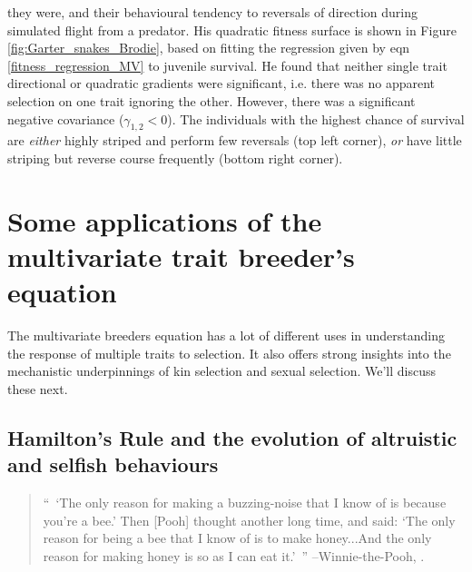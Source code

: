 they were, and their behavioural tendency to reversals of direction
during simulated flight from a predator. His quadratic fitness surface is shown in Figure
\ref{fig:Garter_snakes_Brodie}, based on fitting the
regression given by eqn \eqref{fitness_regression_MV} to juvenile
survival. He found that neither single trait directional or quadratic
gradients were significant, i.e. there was no apparent selection on one 
trait ignoring the other. However, there was a significant negative
covariance ($\gamma_{1,2}<0$). The individuals with the highest chance of survival are
{\it either} highly striped and perform few reversals (top left
corner), {\it or} have little striping but reverse course frequently
(bottom right corner). 


\section{Some applications of the multivariate trait breeder's equation}

The multivariate breeders equation has a lot of different uses in
understanding the response of multiple traits to selection. It also
offers strong insights into the mechanistic underpinnings of kin selection and sexual selection. We'll discuss these next.

\subsection{Hamilton's Rule and the evolution of altruistic and
  selfish behaviours}
\begin{quotation}
``~`The only reason for making a buzzing-noise that I know of is
because you're a bee.' Then [Pooh] thought another long time, and
said: `The only reason for being a bee that I know of is to make
honey...And the only reason for making honey is so as I can eat it.'~''
--Winnie-the-Pooh, \citet{milne}.  
\end{quotation}




